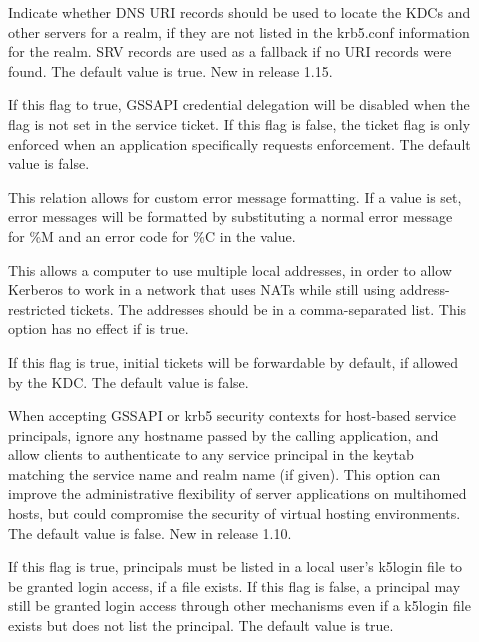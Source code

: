 \documentclass[letterpaper,10pt,english]{sphinxmanual}
\begin{document}
\begin{description}
\item[{}] \leavevmode
Indicate whether DNS URI records should be used to locate the KDCs
and other servers for a realm, if they are not listed in the
krb5.conf information for the realm.  SRV records are used as a
fallback if no URI records were found.  The default value is true.
New in release 1.15.

\item[{}] \leavevmode
If this flag to true, GSSAPI credential delegation will be
disabled when the  flag is not set in the
service ticket.  If this flag is false, the 
ticket flag is only enforced when an application specifically
requests enforcement.  The default value is false.

\item[{}] \leavevmode
This relation allows for custom error message formatting.  If a
value is set, error messages will be formatted by substituting a
normal error message for \%M and an error code for \%C in the value.

\item[{}] \leavevmode
This allows a computer to use multiple local addresses, in order
to allow Kerberos to work in a network that uses NATs while still
using address-restricted tickets.  The addresses should be in a
comma-separated list.  This option has no effect if
 is true.

\item[{}] \leavevmode
If this flag is true, initial tickets will be forwardable by
default, if allowed by the KDC.  The default value is false.

\item[{}] \leavevmode
When accepting GSSAPI or krb5 security contexts for host-based
service principals, ignore any hostname passed by the calling
application, and allow clients to authenticate to any service
principal in the keytab matching the service name and realm name
(if given).  This option can improve the administrative
flexibility of server applications on multihomed hosts, but could
compromise the security of virtual hosting environments.  The
default value is false.  New in release 1.10.

\item[{}] \leavevmode
If this flag is true, principals must be listed in a local user’s
k5login file to be granted login access, if a 
file exists.  If this flag is false, a principal may still be
granted login access through other mechanisms even if a k5login
file exists but does not list the principal.  The default value is
true.


\end{description}
\end{document}

